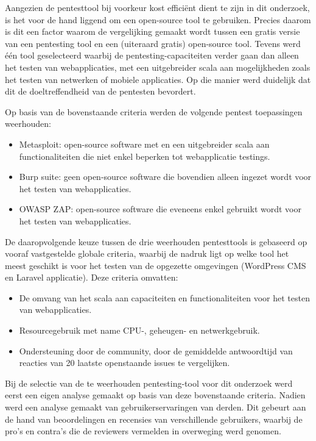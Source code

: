 Aangezien de pentesttool bij voorkeur kost efficiënt dient te zijn in dit onderzoek, is het voor de hand liggend om een open-source tool te gebruiken. Precies daarom 
is dit een factor waarom de vergelijking gemaakt wordt tussen een gratis versie van een pentesting tool en een (uiteraard gratis) open-source tool. 
Tevens werd één tool geselecteerd waarbij de pentesting-capaciteiten verder gaan dan alleen het testen van webapplicaties, met een 
uitgebreider scala aan mogelijkheden zoals het testen van netwerken of mobiele applicaties. Op die manier werd duidelijk dat dit 
de doeltreffendheid van de pentesten bevordert.

Op basis van de bovenstaande criteria werden de volgende pentest toepassingen weerhouden:
\begin{itemize}
    \item Metasploit: open-source software met en een uitgebreider scala aan functionaliteiten die niet enkel beperken tot webapplicatie testings.
    \item Burp suite: geen open-source software die bovendien alleen ingezet wordt voor het testen van webapplicaties.
    \item OWASP ZAP: open-source software die eveneens enkel gebruikt wordt voor het testen van webapplicaties.
\end{itemize}

De daaropvolgende keuze tussen de drie weerhouden pentesttools is gebaseerd op vooraf vastgestelde globale criteria, waarbij de nadruk ligt op welke tool het meest 
geschikt is voor het testen van de opgezette omgevingen (WordPress CMS en Laravel applicatie). Deze criteria omvatten:
\begin{itemize}
    \item De omvang van het scala aan capaciteiten en functionaliteiten voor het testen van webapplicaties.
    \item Resourcegebruik met name CPU-, geheugen- en netwerkgebruik.
    \item Ondersteuning door de community, door de gemiddelde antwoordtijd van reacties van 20 laatste openstaande issues te vergelijken.
\end{itemize}

Bij de selectie van de te weerhouden pentesting-tool voor dit onderzoek werd eerst een eigen analyse gemaakt op basis van deze bovenstaande criteria. 
Nadien werd een analyse gemaakt van gebruikerservaringen van derden. Dit gebeurt aan de hand van beoordelingen en recensies van 
verschillende gebruikers, waarbij de pro's en contra's die de reviewers vermelden in overweging werd genomen. 

